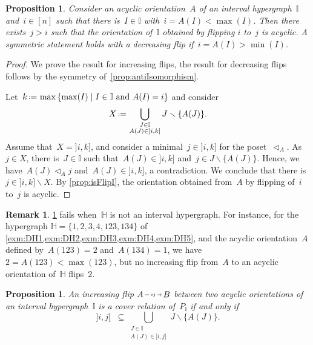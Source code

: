 \documentclass{amsart}
\newtheorem{proposition}[theorem]{Proposition}
\theoremstyle{definition}
\newtheorem{remark}[theorem]{Remark}
\newcommand{\set}[2]{\left\{ #1 \;\middle|\; #2 \right\}} %
\newcommand{\ssm}{\smallsetminus} %
\newcommand{\eqdef}{\mbox{\,\raisebox{0.2ex}{\scriptsize\ensuremath{\mathrm:}}\ensuremath{=}\,}} %
\newcommand{\less}{\vartriangleleft} %
\newcommand{\HH}{\mathbb H}  %
\newcommand{\II}{\mathbb I} %
\newcommand{\flip}[4]{\ensuremath{#1 \, \begin{tikzpicture}[scale=1,baseline=-.1cm] \path[->]  (0,0) edge node[fill=white,inner sep=2pt, font=\tiny ] {$#2#3$} (.7,0); \end{tikzpicture} \, #4}}
\begin{document}
\begin{proposition}
\label{prop:alwaysFlippableI}
Consider an acyclic orientation~$A$ of an interval hypergraph~$\II$ and~$i \in [n]$ such that there is~$I \in \II$ with~$i = A(I) < \max(I)$.
Then there exists~$j > i$ such that the orientation of~$\II$ obtained by flipping $i$ to~$j$ is acyclic.
A symmetric statement holds with a decreasing flip if~$i = A(I) > \min(I)$.
\end{proposition}

\begin{proof}
We prove the result for increasing flips, the result for decreasing flips follows by the symmetry of~\cref{prop:antiIsomorphism}.

Let~$k \eqdef \max\set{\max(I)}{I \in \II \text{ and } A(I) = i}$ and consider
\[
X \eqdef \bigcup_{\substack{J \in \II \\ A(J) \in {]i,k]}}} J \ssm \{A(J)\}.
\]
Assume that~$X = {]i,k]}$, and consider a minimal~$j \in {]i,k]}$ for the poset~$\less_A$.
As~$j \in X$, there is~$J \in \II$ such that~$A(J) \in {]i,k]}$ and~$j \in J \ssm \{A(J)\}$.
Hence, we have~$A(J) \less_A j$ and~$A(J) \in {]i,k]}$, a contradiction.
We conclude that there is~$j \in {]i,k]} \ssm X$.
By \cref{prop:isFlipI}, the orientation obtained from~$A$ by flipping of~$i$ to~$j$ is acyclic.
\end{proof}

\begin{remark}
\cref{prop:alwaysFlippableI} fails when~$\HH$ is not an interval hypergraph.
For instance, for the hypergraph $\HH=\{ 1, 2, 3, 4, 123, 134 \}$ of \cref{exm:DH1,exm:DH2,exm:DH3,exm:DH4,exm:DH5}, and the acyclic orientation~$A$ defined by~$A(123) = 2$ and~$A(134) = 1$, we have~$2 = A(123) < \max(123)$, but no increasing flip from~$A$ to an acyclic orientation of~$\HH$ flips~$2$.
\end{remark}

\begin{proposition}
\label{prop:isCoverI}
An increasing flip \flip{A}{i}{j}{B} between two acyclic orientations of an interval hypergraph~$\II$ is a cover relation of~$P_\II$ if and only if
\[
{]i,j[} \;\; \subseteq \bigcup_{\substack{J \in \II \\ A(J) \in {]i,j]}}} J \ssm \{A(J)\}.
\]
\end{proposition}
\end{document}
